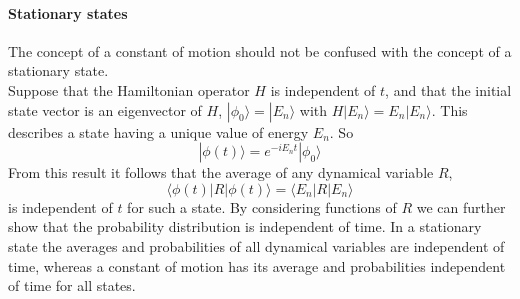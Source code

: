 \documentclass{article}
\begin{document}
\paragraph{Stationary states} 
The concept of a constant of motion should not be confused with the
concept of a stationary state. \\
Suppose that the Hamiltonian operator $H$ is independent of $t$, and that the initial state vector is an eigenvector of $H$, $|\phi_0\rangle = | E_n \rangle$ with $H |E_n\rangle = E_n | E_n \rangle$. This describes a state having a unique value of energy $E_n$. So
\[|\phi(t)\rangle = e^{-iE_nt} |\phi_0\rangle\]
From this result it follows that the average of any dynamical variable $R$,
\[\langle \phi(t) | R | \phi(t) \rangle = \langle E_n | R | E_n \rangle\]
is independent of $t$ for such a state. By considering functions of $R$ we can further show that the probability distribution is independent of time. In a stationary state the averages and probabilities of all dynamical variables are independent of time, whereas a constant of motion has its average and probabilities independent of time for all states.
\end{document}
